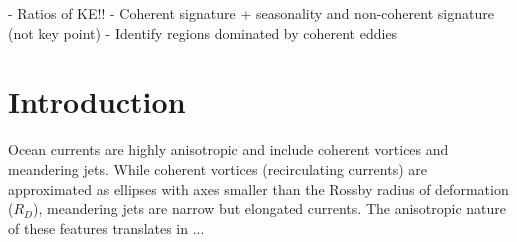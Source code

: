 \documentclass[draft]{agujournal2019}
\begin{document}
-	Ratios of KE!! 
-	Coherent signature + seasonality  and non-coherent signature (not key point)
-	Identify regions dominated by coherent eddies


	
\section{Introduction}

Ocean currents are highly anisotropic and include coherent vortices and meandering jets. While coherent vortices (recirculating currents) are approximated as ellipses with axes smaller than the Rossby radius of deformation ($R_D$), meandering jets are narrow but elongated currents. The anisotropic nature of these features translates in ...


\end{document}

